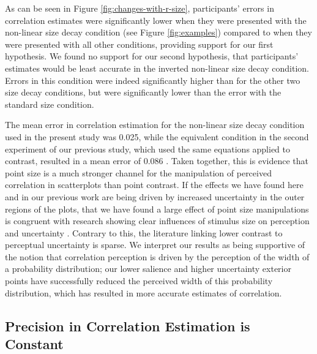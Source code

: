 \documentclass{vgtc}                          %
\begin{document}
As can be seen in Figure \ref{fig:changes-with-r-size},
participants' errors in correlation estimates were significantly lower when
they were presented with the non-linear size decay condition (see Figure \ref{fig:examples})
compared to when they were presented with all other conditions, providing support for our
first hypothesis. We found no support for our second hypothesis, that participants'
estimates would be least accurate in the inverted non-linear size decay condition.
Errors in this condition were indeed significantly higher than for the other two
size decay conditions, but were significantly lower than
the error with the standard size condition.

The mean error in correlation estimation for the non-linear size decay condition used
in the present study was 0.025, while the equivalent condition in the second experiment
of our previous study, which used the same equations applied to contrast, resulted
in a mean error of 0.086 \cite{strain_2023}. Taken together, this is evidence that point
size is a much stronger channel for the manipulation of perceived correlation in
scatterplots than point contrast. If the effects we have found here and in our
previous work are being driven by increased uncertainty in the outer regions of the plots,
that we have found a large effect of point size manipulations is congruent
with research showing clear influences of stimulus size on perception and uncertainty
\cite{hong_2021, grice_1983, alais_2004}. Contrary to this, the literature linking
lower contrast to perceptual uncertainty is sparse. We interpret our results
as being supportive of the notion that correlation perception is driven
by the perception of the width of a probability distribution; our lower salience
and higher uncertainty exterior points have successfully reduced the perceived width
of this probability distribution, which has resulted in more accurate estimates
of correlation.

\hypertarget{precision-in-correlation-estimation-is-constant}{%
\subsection{Precision in Correlation Estimation is Constant}\label{precision-in-correlation-estimation-is-constant}}
\end{document}
